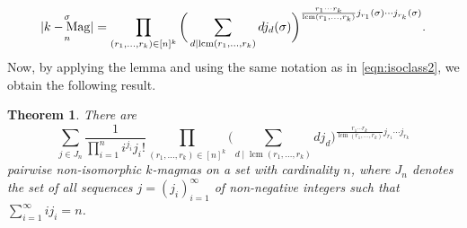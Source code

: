 \documentclass[12pt]{article}
\DeclareMathOperator{\lcm}{lcm}
\DeclareMathOperator{\kMag}{\mathnormal{k}-Mag}
\newtheorem{theorem}{Theorem}
\theoremstyle{definition}
\theoremstyle{remark}
\begin{document}
	\[
	\lvert\kMag_n^\sigma\rvert = \prod_{(r_1,\dots,r_k)\in [n]^k} \bigg(\sum_{d\mid\lcm(r_1,\dots,r_k)} d j_d(\sigma)\bigg)^{\frac{r_1\cdots r_k}{\lcm(r_1,\dots,r_k)}j_{r_1}(\sigma)\cdots j_{r_k}(\sigma)}.
	\]
	Now, by applying the lemma and using the same notation as in \eqref{eqn:isoclass2}, we obtain the following result.
	\begin{theorem}\label{thm:main_k}
	There are
	\begin{equation}\label{eqn:isoclass_k-magma}
	\sum_{j \in J_n} \frac{1}{\prod_{i=1}^n i^{j_i} j_i!} \prod_{(r_1,\dots,r_k)\in [n]^k} \bigg(\sum_{d\mid\lcm(r_1,\dots,r_k)} d j_d\bigg)^{\frac{r_1\cdots r_k}{\lcm(r_1,\dots,r_k)}j_{r_1}\cdots j_{r_k}}
	\end{equation}
	pairwise non-isomorphic $k$-magmas on a set with cardinality $n$, where $J_n$ denotes the set of all sequences $j=(j_i)_{i=1}^{\infty}$ of non-negative integers such that $\sum_{i=1}^{\infty} ij_i = n$.
	\end{theorem}
	
\end{document}

